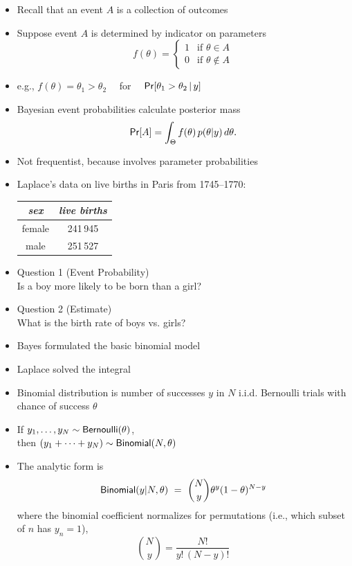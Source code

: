 \documentclass[10pt]{report}
\begin{document}
\begin{itemize}
\item Recall that an event $A$ is a collection of outcomes
\item Suppose event $A$ is determined by indicator on parameters
\[
f(\theta) 
= 
\begin{cases}
1 & \text{if } \theta \in A
\\
0 & \text{if } \theta \not\in A
\end{cases}
\]
\item e.g., $f(\theta) = \theta_1 > \theta_2$ 
\ \ for \ \ $\text{\sf Pr}[\theta_1 > \theta_2 \, | \, y]$
\item Bayesian event probabilities calculate posterior mass
\[
\text{\sf Pr}[A] = \int_{\Theta} f(\theta) \, p(\theta|y) \, d\theta.
\]
\item Not frequentist, because involves parameter probabilities
\end{itemize}


\begin{itemize}
\item Laplace's data on live births in Paris from 1745--1770: 
\begin{center}\small
\begin{tabular}{c|c}
{\slshape sex} & {\slshape live births}
\\ \hline
female & 241\,945 
\\
male & 251\,527
\end{tabular}
\end{center}
\item Question 1 (Event Probability) 
\\  
Is a boy more likely to be born than a girl?
\item Question 2 (Estimate) 
\\  
What is the birth rate of boys vs. girls?
\item Bayes formulated the basic binomial model
\item Laplace solved the integral
\end{itemize}

\begin{itemize}
\item Binomial distribution is number of successes $y$ in $N$ 
i.i.d. Bernoulli trials with chance of success $\theta$
\item If $y_1,\ldots,y_N\sim \text{\sf Bernoulli}(\theta)$, 
\\[4pt] then $(y_1 + \cdots + y_N) \sim \text{\sf Binomial}(N,\theta)$
\item The analytic form is
\[
\text{\sf Binomial}(y|N,\theta) 
\ = \ \binom{N}{y} \theta^{y} (1 - \theta)^{N-y}
\]
where the binomial coefficient normalizes for permutations (i.e.,
which subset of $n$ has $y_n = 1$),
\[
\binom{N}{y} = \frac{N!}{y! \, (N-y)!}
\]
\end{itemize}
\end{document}
